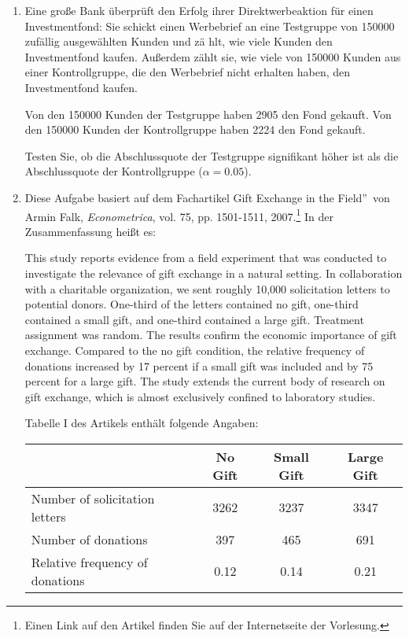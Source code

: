 \begin{enumerate}
\item Eine gro\ss e Bank \"{u}berpr\"{u}ft den Erfolg ihrer
Direktwerbeaktion f\"{u}r einen Investmentfond: Sie schickt einen Werbebrief
an eine Testgruppe von 150000 zuf\"{a}llig ausgew\"{a}hlten Kunden und z\"{a}%
hlt, wie viele Kunden den Investmentfond kaufen. Au\ss erdem z\"{a}hlt sie,
wie viele von 150000 Kunden aus einer Kontrollgruppe, die den Werbebrief
nicht erhalten haben, den Investmentfond kaufen.

Von den 150000 Kunden der Testgruppe haben 2905 den Fond gekauft. Von den
150000 Kunden der Kontrollgruppe haben 2224 den Fond gekauft.

Testen Sie, ob die Abschlussquote der Testgruppe signifikant h\"{o}her ist
als die Abschlussquote der Kontrollgruppe ($\alpha =0.05$).

\item Diese Aufgabe basiert auf dem Fachartikel \quotedblbase Gift Exchange
in the Field\textquotedblright\ von Armin Falk, \emph{Econometrica}, vol.
75, pp. 1501-1511, 2007.\footnote{%
Einen Link auf den Artikel finden Sie auf der Internetseite der Vorlesung.}
In der Zusammenfassung hei\ss t es:

This study reports evidence from a field experiment that was conducted to
investigate the relevance of gift exchange in a natural setting. In
collaboration with a charitable organization, we sent roughly 10,000
solicitation letters to potential donors. One-third of the letters contained
no gift, one-third contained a small gift, and one-third contained a large
gift. Treatment assignment was random. The results confirm the economic
importance of gift exchange. Compared to the no gift condition, the relative
frequency of donations increased by 17 percent if a small gift was included
and by 75 percent for a large gift. The study extends the current body of
research on gift exchange, which is almost exclusively confined to
laboratory studies.

Tabelle I des Artikels enth\"{a}lt folgende Angaben:

\begin{center}%
\begin{tabular}{lccc}
\hline\hline
& No Gift & Small Gift & Large Gift \\ \hline
Number of solicitation letters & 3262 & 3237 & 3347 \\ 
Number of donations & 397 & 465 & 691 \\ 
Relative frequency of donations & 0.12 & 0.14 & 0.21 \\ \hline
\end{tabular}%
\end{center}%


\end{enumerate}
